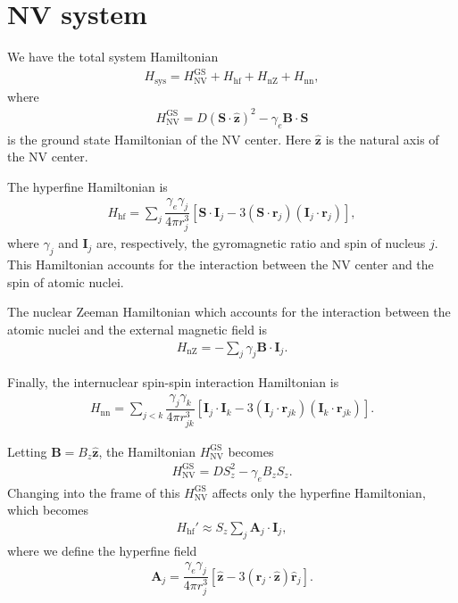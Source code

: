 \documentclass[11pt]{article}
\renewcommand{\t}{\text} %
\newcommand{\f}[2]{\dfrac{#1}{#2}} %
\newcommand{\p}[1]{\left(#1\right)} %
\renewcommand{\sp}[1]{\left[#1\right]} %
\renewcommand{\v}{\bm} %
\newcommand{\uv}[1]{\hat{\v{#1}}} %
\renewcommand{\c}{\cdot} %
\begin{document}
\newpage
\section*{NV system}

We have the total system Hamiltonian
\begin{align}
  H_{\t{sys}}=H_{\t{NV}}^{\t{GS}}+H_{\t{hf}}+H_{\t{nZ}}+H_{\t{nn}},
\end{align}
where
\begin{align}
  H_{\t{NV}}^{\t{GS}}=D\p{\v S\c\uv z}^2-\gamma_e\v B\c\v S
\end{align}
is the ground state Hamiltonian of the NV center. Here $\uv z$ is the
natural axis of the NV center.

The hyperfine Hamiltonian is
\begin{align}
  H_{\t{hf}}=\sum_j\f{\gamma_e\gamma_j}{4\pi r_j^3} \sp{\v S\c\v I_j
    -3\p{\v S\c\v r_j}\p{\v I_j\c\v r_j}},
\end{align}
where $\gamma_j$ and $\v I_j$ are, respectively, the gyromagnetic
ratio and spin of nucleus $j$. This Hamiltonian accounts for the
interaction between the NV center and the spin of atomic nuclei.

The nuclear Zeeman Hamiltonian which accounts for the interaction
between the atomic nuclei and the external magnetic field is
\begin{align}
  H_{\t{nZ}}=-\sum_j\gamma_j\v B\c\v I_j.
\end{align}

Finally, the internuclear spin-spin interaction Hamiltonian is
\begin{align}
  H_{\t{nn}}=\sum_{j<k}\f{\gamma_j\gamma_k}{4\pi r_{jk}^3}\sp{\v
    I_j\c\v I_k-3\p{\v I_j\c\v r_{jk}}\p{\v I_k\c\v r_{jk}}}.
\end{align}

Letting $\v B=B_z\uv z$, the Hamiltonian $H_{\t{NV}}^{\t{GS}}$ becomes
\begin{align}
  H_{\t{NV}}^{\t{GS}}=DS_z^2-\gamma_eB_zS_z.
\end{align}
Changing into the frame of this $H_{\t{NV}}^{\t{GS}}$ affects only the
hyperfine Hamiltonian, which becomes
\begin{align}
  H_{\t{hf}}'\approx S_z\sum_j\v A_j\c\v I_j,
\end{align}
where we define the hyperfine field
\begin{align}
  \v A_j=\f{\gamma_e\gamma_j}{4\pi r_j^3}\sp{\uv z-3\p{\uv r_j\c\uv
      z}\uv r_j}.
\end{align}
\end{document}
